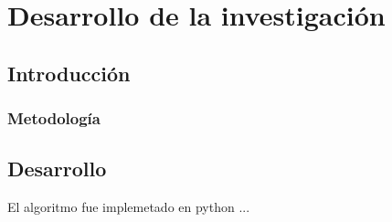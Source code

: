 \chapter{Desarrollo de la investigaci\'{o}n}
\label{sec:chapter4}

\section{Introducci\'{o}n}




\subsection{Metodolog\'ia}




\section{Desarrollo}

El algoritmo fue implemetado en python ...\\

